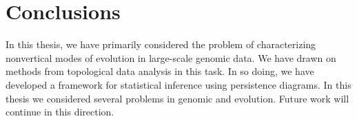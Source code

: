 \chapter{Conclusions}

In this thesis, we have primarily considered the problem of characterizing nonvertical modes of evolution in large-scale genomic data.
We have drawn on methods from topological data analysis in this task.
In so doing, we have developed a framework for statistical inference using persistence diagrams.
In this thesis we considered several problems in genomic and evolution.
Future work will continue in this direction.